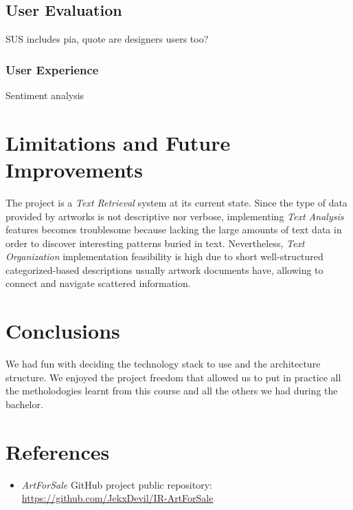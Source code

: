\documentclass[12pt]{spieman}  %
\begin{document}
\begin{spacing}{1}
    \subsection{User Evaluation}

    SUS includes pia, quote are designers users too?

    \subsubsection{User Experience}\label{sec:ux}
    Sentiment analysis


    \section{Limitations and Future Improvements}

    The project is a \textit{Text Retrieval} system at its current state.
    Since the type of data provided by artworks is not descriptive nor verbose,
    implementing \textit{Text Analysis} features becomes troublesome because lacking the large amounts of
    text data in order to discover interesting patterns buried in text.
    Nevertheless, \textit{Text Organization} implementation feasibility is high due to
    short well-structured categorized-based descriptions usually artwork documents have,
    allowing to connect and navigate scattered information.

    \section{Conclusions}
    We had fun with deciding the technology stack to use and the architecture structure.
    We enjoyed the project freedom that allowed us to put in practice all the metholodogies
    learnt from this course and all the others we had during the bachelor.

    \section{References}
    \begin{itemize}
        \item \textit{ArtForSale} GitHub project public repository:\\
              \url{https://github.com/JekxDevil/IR-ArtForSale}
    \end{itemize}

\end{spacing}
\end{document}
